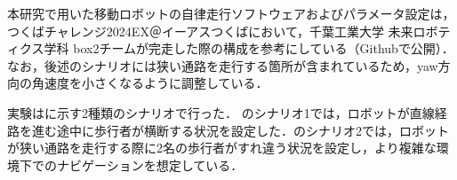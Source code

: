 
本研究で用いた移動ロボットの自律走行ソフトウェアおよびパラメータ設定は，つくばチャレンジ2024EX＠イーアスつくば\cite{つくばチャレンジ36:online}において，千葉工業大学 未来ロボティクス学科 box2チームが完走した際の構成を参考にしている（Github\cite{openrdco85:online}で公開）．なお，後述のシナリオには狭い通路を走行する箇所が含まれているため，yaw方向の角速度を小さくなるように調整している．

\newpage

実験はに示す2種類のシナリオで行った．
のシナリオ1では，ロボットが直線経路を進む途中に歩行者が横断する状況を設定した．のシナリオ2では，ロボットが狭い通路を走行する際に2名の歩行者がすれ違う状況を設定し，より複雑な環境下でのナビゲーションを想定している．

